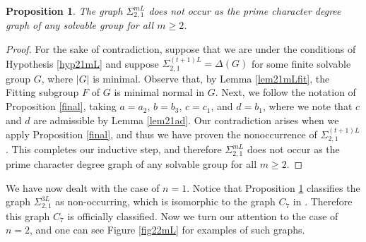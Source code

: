 \documentclass[11pt]{amsart}
\newtheorem{proposition}[theorem]{Proposition}
\theoremstyle{definition}
\theoremstyle{remark}
\numberwithin{equation}{section}
\newcommand{\SLi}[3]{\Sigma_{#1,#2}^{#3L}} %
\begin{document}
\begin{proposition}\label{prop21mL}
The graph $\SLi{2}{1}{m}$ does not occur as the prime character degree graph of any solvable group for all $m\geq2$.
\end{proposition}
\begin{proof}
For the sake of contradiction, suppose that we are under the conditions of Hypothesis \ref{hyp21mL} and suppose $\SLi{2}{1}{(t+1)}=\Delta(G)$ for some finite solvable group $G$, where $|G|$ is minimal. Observe that, by Lemma \ref{lem21mLfit}, the Fitting subgroup $F$ of $G$ is minimal normal in $G$. Next, we follow the notation of Proposition \ref{final}, taking $a=a_2$, $b=b_3$, $c=c_1$, and $d=b_1$, where we note that $c$ and $d$ are admissible by Lemma \ref{lem21ad}. Our contradiction arises when we apply Proposition \ref{final}, and thus we have proven the nonoccurrence of $\SLi{2}{1}{(t+1)}$. This completes our inductive step, and therefore $\SLi{2}{1}{m}$ does not occur as the prime character degree graph of any solvable group for all $m\geq2$.
\end{proof}

We have now dealt with the case of $n=1$. Notice that Proposition \ref{prop21mL} classifies the graph $\SLi{2}{1}{3}$ as non-occurring, which is isomorphic to the graph $C_7$ in \cite{LS2}. Therefore this graph $C_7$ is officially classified. Now we turn our attention to the case of $n=2$, and one can see Figure \ref{fig22mL} for examples of such graphs.
\end{document}

